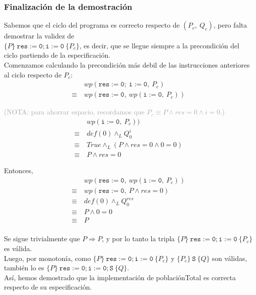 \documentclass[10pt,a4paper]{article}
\begin{document}
\subsubsection{Finalización de la demostración}
Sabemos que el ciclo del programa es correcto respecto de $(P_c, \ Q_c)$, pero falta demostrar la validez de \\
$\{P\} \ \mathtt{res := 0; i := 0} \ \{P_c\}$, es decir, que se llegue siempre a la precondición del ciclo partiendo de la especificación. \\

Comenzamos calculando la precondición más debil de las instrucciones anteriores al ciclo respecto de $P_c$:
\begin{equation*}
    \begin{split}
    & wp(\mathtt{res := 0; \ i := 0}, \ P_c) \\
    \equiv \ & wp(\mathtt{res := 0}, \ wp(\mathtt{i := 0}, \ P_c))
    \end{split}
\end{equation*}

\textcolor{darkgray}{(\textsc{NOTA}: para ahorrar espacio, recordamos que $P_c \equiv P \land res = 0 \land i = 0$.)}\\
\begin{equation*}
    \begin{split}
    & wp(\mathtt{i := 0}, \ P_c)) \\
    \equiv \ & def(0) \land_L Q_{0}^{i} \\
    \equiv \ & True \land_L (P \land res = 0 \land 0 = 0) \\
    \equiv \ & P \land res = 0
    \end{split}
\end{equation*}

Entonces, \\
\begin{equation*}
    \begin{split}
    & wp(\mathtt{res := 0}, \ wp(\mathtt{i := 0}, \ P_c)) \\
    \equiv \ & wp(\mathtt{res := 0}, \ P \land res = 0) \\
    \equiv \ & def(0) \land_L Q_{0}^{res} \\
    \equiv \ & P \land 0 = 0 \\
    \equiv \ & P \\
    \end{split}
\end{equation*}

Se sigue trivialmente que $P \Rightarrow P$, y por lo tanto la tripla $\{P\} \ \mathtt{res := 0; i := 0} \ \{P_c\}$ es válida. \\
Luego, por monotonía, como $\{P\} \ \mathtt{res := 0; i := 0} \ \{P_c\}$ y $\{P_c\} \ \mathtt{S} \ \{Q\}$ son válidas, también lo es $\{P\} \ \mathtt{res := 0; i := 0; S} \ \{Q\}$. \\
Así, hemos demostrado que la implementación de \textsf{poblaciónTotal} es correcta respecto de su especificación.
\end{document}
